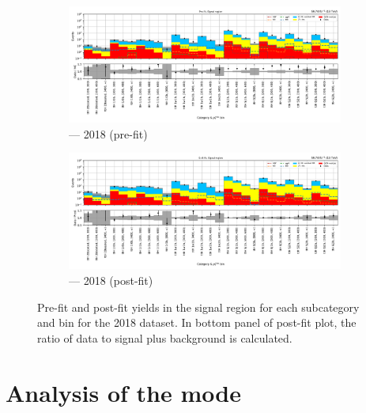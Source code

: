 \begin{figure}[htbp]
    \centering
    \begin{subfigure}[b]{0.9\textwidth}
        \includegraphics[width=\textwidth]{figures/mountain_ranges/2018/ttH/SR_tree_prefit-abs_values_ttH_cats.pdf}
        \caption{\ttH --- 2018 (pre-fit)}
    \end{subfigure}

    \begin{subfigure}[b]{0.9\textwidth}
        \includegraphics[width=\textwidth]{figures/mountain_ranges/2018/ttH/SR_tree_fit_s-abs_values_ttH_cats.pdf}
        \caption{\ttH --- 2018 (post-fit)}
    \end{subfigure}
    \caption[Pre-fit and post-fit yields in the signal region for each \ttH subcategory and \ptmiss bin for the 2018 dataset]{Pre-fit and post-fit yields in the signal region for each \ttH subcategory and \ptmiss bin for the 2018 dataset. In bottom panel of post-fit plot, the ratio of data to signal plus background is calculated.}
    \label{fig:htoinv_mountain_range_ttH_2018}
\end{figure}

\clearpage




\section{Analysis of the \texorpdfstring{\VH}{VH} mode}
\label{sec:htoinv_analysis_VH}

